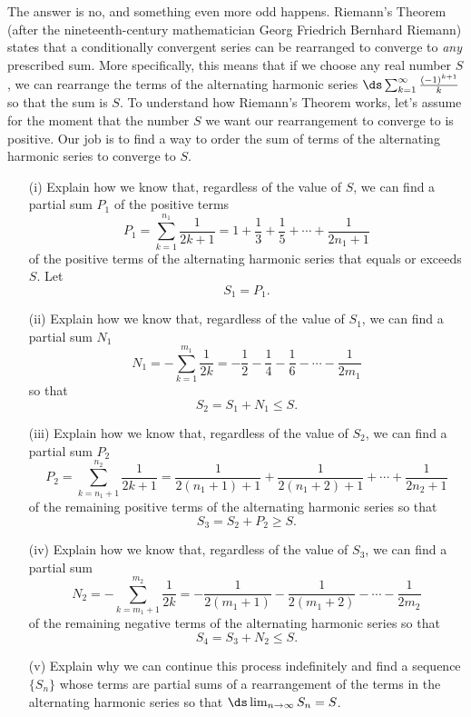 \begin{exercises}
 The answer is no, and something even more odd happens. Riemann's Theorem (after the nineteenth-century mathematician Georg Friedrich Bernhard Riemann) states that a conditionally convergent series can be rearranged to converge to \emph{any} prescribed sum. More specifically, this means that if we choose any real number $S$, we can rearrange the terms of the alternating harmonic series $\ds \sum_{k=1}^{\infty} \frac{(-1)^{k+1}}{k}$ so that the sum is $S$. To understand how Riemann's Theorem works, let's assume for the moment that the number $S$ we want our rearrangement to converge to is positive. Our job is to find a way to order the sum of terms of the alternating harmonic series to converge to $S$.
    \begin{itemize}
    \item[(i)] Explain how we know that, regardless of the value of $S$, we can find a partial sum $P_1$ of the positive terms
    \[P_1 = \sum_{k=1}^{n_1} \frac{1}{2k+1} = 1 + \frac{1}{3} + \frac{1}{5} + \cdots + \frac{1}{2n_1+1}\]
    of the positive terms of the alternating harmonic series that equals or exceeds $S$. Let
    \[S_1 = P_1.\]

    \item[(ii)] Explain how we know that, regardless of the value of $S_1$, we can find a partial sum $N_1$
    \[N_1 = -\sum_{k=1}^{m_1} \frac{1}{2k} = -\frac{1}{2} - \frac{1}{4} - \frac{1}{6} - \cdots - \frac{1}{2m_1}\]
    so that
    \[S_2 = S_1 + N_1 \leq S.\]

    \item[(iii)] Explain how we know that, regardless of the value of $S_2$, we can find a partial sum $P_2$
    \[P_2 = \sum_{k=n_1+1}^{n_2} \frac{1}{2k+1} = \frac{1}{2(n_1+1)+1} + \frac{1}{2(n_1+2)+1} + \cdots + \frac{1}{2n_2+1}\]
    of the remaining positive terms of the alternating harmonic series so that
    \[S_3 = S_2 + P_2 \geq S.\]

    \item[(iv)] Explain how we know that, regardless of the value of $S_3$, we can find a partial sum
    \[N_2 = -\sum_{k=m_1+1}^{m_2} \frac{1}{2k} = -\frac{1}{2(m_1+1)} - \frac{1}{2(m_1+2)} - \cdots - \frac{1}{2m_2}\]
     of the remaining negative terms of the alternating harmonic series so that
    \[S_4 = S_3 + N_2 \leq S.\]

    \item[(v)] Explain why we can continue this process indefinitely and find a sequence $\{S_n\}$ whose terms are partial sums of a rearrangement of the terms in the alternating harmonic series so that $\ds \lim_{n \to \infty} S_n = S$.


    \end{itemize}

 \ea





\end{exercises}


\afterexercises
